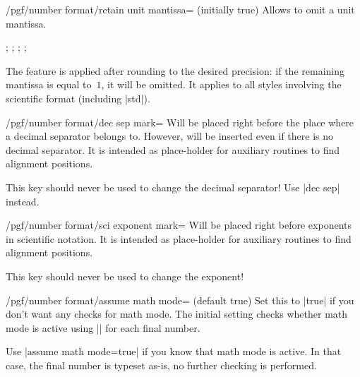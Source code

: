 \begin{key}{/pgf/number format/retain unit mantissa= (initially true)}
    Allows to omit a unit mantissa.
\begin{codeexample}[pre={\begin{lateximage}},post={\end{lateximage}}]
;
;
;
;
\end{codeexample}
    The feature is applied after rounding to the desired precision: if the
    remaining mantissa is equal to~$1$, it will be omitted. It applies to all
    styles involving the scientific format (including |std|).
\end{key}

\begin{key}{/pgf/number format/\protect\atmarktext dec sep mark=}
    Will be placed right before the place where a decimal separator belongs to.
    However,  will be inserted even if there is no decimal
    separator. It is intended as place-holder for auxiliary routines to find
    alignment positions.

    This key should never be used to change the decimal separator!
    Use |dec sep| instead.
\end{key}

\begin{key}{/pgf/number format/\protect\atmarktext sci exponent mark=}
    Will be placed right before exponents in scientific notation. It is
    intended as place-holder for auxiliary routines to find alignment
    positions.

    This key should never be used to change the exponent!
\end{key}

\begin{key}{/pgf/number format/assume math mode= (default true)}
    Set this to |true| if you don't want any checks for math mode. The initial
    setting checks whether math mode is active using |\pgfutilensuremath| for
    each final number.

    Use |assume math mode=true| if you know that math mode is active. In that
    case, the final number is typeset as-is, no further checking is performed.
\end{key}

